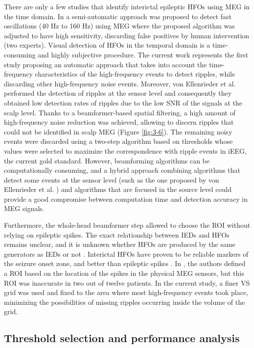 There are only a few studies that identify interictal epileptic HFOs using MEG in the time domain. In \citep{vonEllenrieder2016} a semi-automatic approach was proposed to detect fast oscillations (40 Hz to 160 Hz) using MEG where the proposed algorithm was adjusted to have high sensitivity, discarding false positives by human intervention (two experts).  Visual detection of HFOs in the temporal domain is a time-consuming and highly subjective procedure. The current work represents the first study proposing an automatic approach that takes into account the time-frequency characteristics of the high-frequency events to detect ripples, while discarding other high-frequency noise events. Moreover, von Ellenrieder et al. performed the detection of ripples at the sensor level and consequently they obtained low detection rates of ripples due to the low SNR of the signals at the scalp level.  Thanks to a beamformer-based spatial filtering, a high amount of high-frequency noise reduction was achieved, allowing to discern ripples that could not be identified in scalp MEG (Figure \ref{fig:3-6}). The remaining noisy events were discarded using a two-step algorithm based on thresholds whose values were selected to maximize the correspondence with ripple events in iEEG, the current gold standard. However, beamforming algorithms can be computationally consuming, and a hybrid approach combining algorithms that detect some events at the sensor level (such as the one proposed by von Ellenrieder et al. \citep{vonEllenrieder2016}) and algorithms that are focused in the source level could provide a good compromise between computation time and detection accuracy in MEG signals.

Furthermore, the whole-head beamformer step allowed to choose the ROI without relying on epileptic spikes. The exact relationship between IEDs and HFOs remains unclear, and it is unknown whether HFOs are produced by the same generators as IEDs or not \citep{Jacobs2008}. Interictal HFOs have proven to be reliable markers of the seizure onset zone, and better than epileptic spikes \citep{Jacobs2010,Jacobs2008}. In \citep{vanKlink2015}, the authors defined a ROI based on the location of the spikes in the physical MEG sensors, but this ROI was inaccurate in two out of twelve patients. In the current study, a finer VS grid was used and fixed to the area where most high-frequency events took place, minimizing the possibilities of missing ripples occurring inside the volume of the grid. 


\subsection{Threshold selection and performance analysis}

